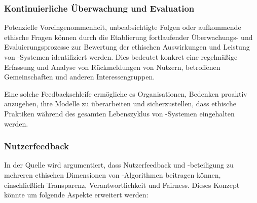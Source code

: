 \documentclass[hidelinks,12pt]{report}
\begin{document}
\subsubsection{Kontinuierliche Überwachung und Evaluation}
Potenzielle Voreingenommenheit, unbeabsichtigte Folgen oder aufkommende ethische Fragen können durch die Etablierung fortlaufender Überwachungs- und Evaluierungsprozesse zur Bewertung der ethischen Auswirkungen und Leistung von -Systemen identifiziert werden. Dies bedeutet konkret eine regelmäßige Erfassung und Analyse von Rückmeldungen von Nutzern, betroffenen Gemeinschaften und anderen Interessengruppen. 

Eine solche Feedbackschleife ermögliche es Organisationen, Bedenken proaktiv anzugehen, ihre Modelle zu überarbeiten und sicherzustellen, dass ethische Praktiken während des gesamten Lebenszyklus von -Systemen eingehalten werden.

\subsubsection{Nutzerfeedback}
In der Quelle \cite{Mittelstadt} wird argumentiert, dass Nutzerfeedback und -beteiligung zu mehreren ethischen Dimensionen von -Algorithmen beitragen können, einschließlich Transparenz, Verantwortlichkeit und Fairness. Dieses Konzept könnte um folgende Aspekte erweitert werden:
\end{document}
